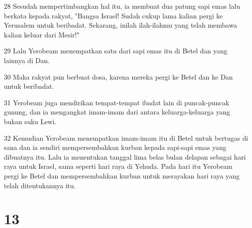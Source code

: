 \par 28 Sesudah mempertimbangkan hal itu, ia membuat dua patung sapi emas lalu berkata kepada rakyat, "Bangsa Israel! Sudah cukup lama kalian pergi ke Yerusalem untuk beribadat. Sekarang, inilah ilah-ilahmu yang telah membawa kalian keluar dari Mesir!"
\par 29 Lalu Yerobeam menempatkan satu dari sapi emas itu di Betel dan yang lainnya di Dan.
\par 30 Maka rakyat pun berbuat dosa, karena mereka pergi ke Betel dan ke Dan untuk beribadat.
\par 31 Yerobeam juga mendirikan tempat-tempat ibadat lain di puncak-puncak gunung, dan ia mengangkat imam-imam dari antara keluarga-keluarga yang bukan suku Lewi.
\par 32 Kemudian Yerobeam menempatkan imam-imam itu di Betel untuk bertugas di sana dan ia sendiri mempersembahkan kurban kepada sapi-sapi emas yang dibuatnya itu. Lalu ia menentukan tanggal lima belas bulan delapan sebagai hari raya untuk Israel, sama seperti hari raya di Yehuda. Pada hari itu Yerobeam pergi ke Betel dan mempersembahkan kurban untuk merayakan hari raya yang telah ditentukannya itu.

\chapter{13}

